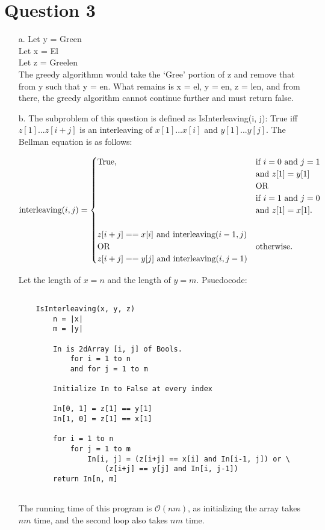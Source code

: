\documentclass[12pt]{article}
\begin{document}
\section*{Question 3} 
\begin{enumerate}
    \item[a.] Let y = Green\\
              Let x = El\\
              Let z = Greelen\\
 
              The greedy algorithmn would take the `Gree' portion of z and remove that from y such that y = en.
              What remains is x = el, y = en, z = len, and from there, the greedy algorithm cannot continue further
              and must return false.

    \item[b.] The subproblem of this question is defined as IsInterleaving(i, j): True iff $z[1] ... z[i+j]$ is an interleaving of $x[1] ... x[i]$ and $y[1] ... y[j]$. The Bellman equation is as follows:
    
    \begin{equation*}
        \text{interleaving}(i,j)=\begin{cases}
    \text{True}, & \text{if $i = 0$ and $j = 1$} \\ & \text{and $z[1] = y[1]$} \\ & \text{OR} \\ & \text{if $i = 1$ and $j = 0$} \\ & \text{and $z[1] = x[1]$}.\\ \\
    z[i+j] == x[i] \newline \text{ and interleaving}(i-1, j) \\ \text{OR} & \text{otherwise}. \\ z[i+j] == y[j] \text{ and interleaving}(i, j-1)
    \end{cases}
    \end{equation*}
    
    Let the length of $x = n$ and the length of $y = m$. Psuedocode: 
    \begin{verbatim}

    IsInterleaving(x, y, z)
        n = |x|
        m = |y|
        
        In is 2dArray [i, j] of Bools.
            for i = 1 to n
            and for j = 1 to m
        
        Initialize In to False at every index
        
        In[0, 1] = z[1] == y[1]
        In[1, 0] = z[1] == x[1]
        
        for i = 1 to n
            for j = 1 to m
                In[i, j] = (z[i+j] == x[i] and In[i-1, j]) or \
                    (z[i+j] == y[j] and In[i, j-1])
        return In[n, m]
            
    \end{verbatim}
    The running time of this program is $\mathcal{O}(nm)$, as initializing the array takes $nm$ time, and the second loop also takes $nm$ time.

\end{enumerate}
\end{document}
